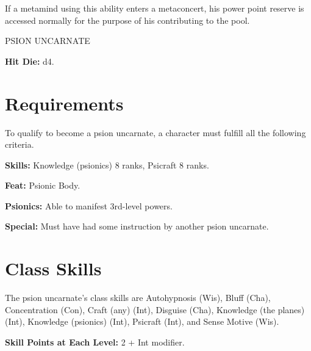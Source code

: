 \documentclass{article}
\begin{document}
If a metamind using this ability enters a metaconcert, his power point reserve 
is accessed normally for the purpose of his contributing to the pool.

\vspace{12pt}
{\LARGE{}PSION UNCARNATE}

\textbf{Hit Die:} d4.

\vspace{12pt}
\section*{\textbf{Requirements}}

To qualify to become a psion uncarnate, a character must fulfill all the following 
criteria.

\textbf{Skills:} Knowledge (psionics) 8 ranks, Psicraft 8 ranks.

\textbf{Feat:} Psionic Body.

\textbf{Psionics:} Able to manifest 3rd-level powers.

\textbf{Special:} Must have had some instruction by another psion uncarnate.

\vspace{12pt}
\section*{\textbf{Class Skills}}

The psion uncarnate's class skills are Autohypnosis (Wis), Bluff (Cha), Concentration 
(Con), Craft (any) (Int), Disguise (Cha), Knowledge (the planes) (Int), Knowledge 
(psionics) (Int), Psicraft (Int), and Sense Motive (Wis).

\textbf{Skill Points at Each Level:} 2 + Int modifier.
\end{document}
